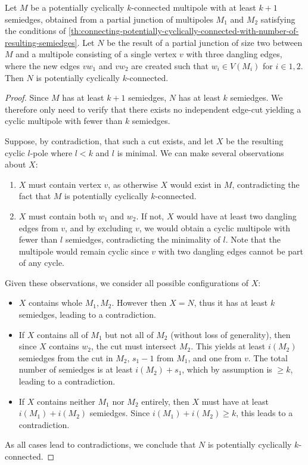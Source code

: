 \documentclass[12pt, twoside]{book}
\begin{document}
\begin{lemma}\label{lem:adding-point-to-partial-junction-of-two}
	Let $M$ be a potentially cyclically $k$-connected multipole with at least $k+1$ semiedges, obtained from a partial junction of multipoles $M_1$ and $M_2$ satisfying the conditions of \cref{th:connecting-potentially-cyclically-connected-with-number-of-resulting-semiedges}. Let $N$ be the result of a partial junction of size two between $M$ and a multipole consisting of a single vertex $v$ with three dangling edges, where the new edges $vw_1$ and $vw_2$ are created such that $w_i\in V(M_i)$ for $i\in{1,2}$. Then $N$ is potentially cyclically $k$-connected.
\end{lemma}

\begin{proof}
	Since $M$ has at least $k+1$ semiedges, $N$ has at least $k$ semiedges. We therefore only need to verify that there exists no independent edge-cut yielding a cyclic multipole with fewer than $k$ semiedges.
	
	Suppose, by contradiction, that such a cut exists, and let $X$ be the resulting cyclic $l$-pole where $l<k$ and $l$ is minimal. We can make several observations about $X$:
	\begin{enumerate}[label=(\roman*)]
		\item $X$ must contain vertex $v$, as otherwise $X$ would exist in $M$, contradicting the fact that $M$ is potentially cyclically $k$-connected.
		\item $X$ must contain both $w_1$ and $w_2$. If not, $X$ would have at least two dangling edges from $v$, and by excluding $v$, we would obtain a cyclic multipole with fewer than $l$ semiedges, contradicting the minimality of $l$. Note that the multipole would remain cyclic since $v$ with two dangling edges cannot be part of any cycle.
	\end{enumerate}
	
	Given these observations, we consider all possible configurations of $X$:
	\begin{itemize}
		\item $X$ contains whole $M_1,M_2$. However then $X=N$, thus it has at least $k$ semiedges, leading to a contradiction.
		\item If $X$ contains all of $M_1$ but not all of $M_2$ (without loss of generality), then since $X$ contains $w_2$, the cut must intersect $M_2$. This yields at least $i(M_2)$ semiedges from the cut in $M_2$, $s_1-1$ from $M_1$, and one from $v$. The total number of semiedges is at least $i(M_2)+s_1$, which by assumption is $\geq k$, leading to a contradiction.
		\item If $X$ contains neither $M_1$ nor $M_2$ entirely, then $X$ must have at least $i(M_1)+i(M_2)$ semiedges. Since $i(M_1)+i(M_2)\geq k$, this leads to a contradiction.
	\end{itemize}

	As all cases lead to contradictions, we conclude that $N$ is potentially cyclically $k$-connected.
\end{proof}
\end{document}
